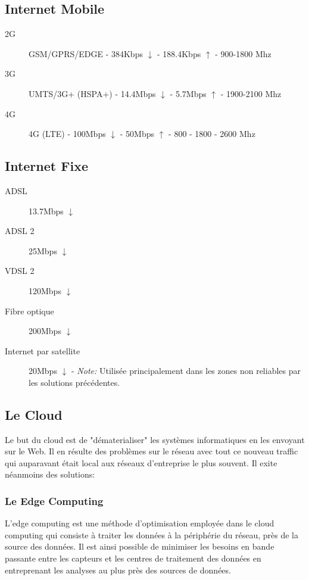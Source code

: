 \documentclass[a4paper, 12pt, french]{article}
\begin{document}
	\subsection{Internet Mobile}  
	\begin{description}
		\item[2G] GSM/GPRS/EDGE - 384Kbps $\downarrow$ - 188.4Kbps $\uparrow$ - 900-1800 Mhz
		\item[3G] UMTS/3G+ (HSPA+) - 14.4Mbps $\downarrow$ - 5.7Mbps $\uparrow$ - 1900-2100 Mhz
		\item[4G] 4G (LTE) - 100Mbps $\downarrow$ - 50Mbps $\uparrow$ - 800 - 1800 - 2600 Mhz
	\end{description}

	\subsection{Internet Fixe}  
	\begin{description}
		\item[ADSL] 13.7Mbps $\downarrow$
		\item[ADSL 2] 25Mbps $\downarrow$
		\item[VDSL 2] 120Mbps $\downarrow$
		\item[Fibre optique] 200Mbps $\downarrow$
		\item[Internet par satellite] 20Mbps $\downarrow$ - \emph{Note:} Utilisée principalement dans les zones non reliables par les solutions précédentes.
	\end{description}

	\subsection{Le Cloud}

	Le but du cloud est de "dématerialiser" les systèmes informatiques en les envoyant sur le Web. Il en résulte des problèmes sur le réseau avec tout ce nouveau traffic qui auparavant était local aux réseaux d'entreprise le plus souvent. Il exite néanmoins des solutions:

	\subsubsection{Le Edge Computing}

	L'edge computing est une méthode d'optimisation employée dans le cloud computing qui consiste à traiter les données à la périphérie du réseau, près de la source des données. Il est ainsi possible de minimiser les besoins en bande passante entre les capteurs et les centres de traitement des données en entreprenant les analyses au plus près des sources de données.
\end{document}
